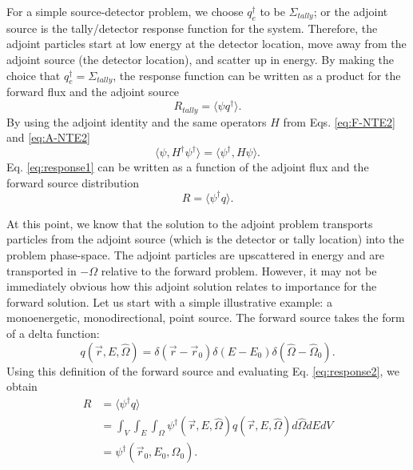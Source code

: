 For a simple source-detector problem, we choose
$q_{e}^{\dagger}$ to be $\Sigma_{tally}$; or the adjoint source is the
tally/detector response function
for the system. Therefore, the adjoint particles start at low energy at the detector
location, move away from the adjoint source (the detector location), and scatter
up in energy. By making the choice that $q_{e}^{\dagger} = \Sigma_{tally}$, the
response function can be written as a product for the forward flux and the
adjoint source
\begin{equation}
  R_{tally} = \langle \psi q^{\dagger} \rangle .
  \label{eq:response1}
\end{equation}
By using the adjoint identity and the same operators $H$ from Eqs. \eqref{eq:F-NTE2}
and \eqref{eq:A-NTE2}
\begin{equation}
  \langle \psi, H^{\dagger} \psi^{\dagger} \rangle =
  \langle \psi^{\dagger}, H \psi \rangle .
\end{equation}
Eq. \eqref{eq:response1} can be written as a function of the
adjoint flux and the forward source distribution
\begin{equation}
  R = \langle \psi^{\dagger} q \rangle .
  \label{eq:response2}
\end{equation}

At this point, we know that the solution to the adjoint problem
transports particles from the adjoint source (which is the detector or tally
location) into the problem phase-space. The adjoint particles are
upscattered in energy and are transported in $-\Omega$ relative to the forward
problem. However, it may not be immediately obvious how this adjoint solution
relates to importance for the forward solution. Let us start with a simple
illustrative example: a monoenergetic, monodirectional, point source. The
forward source takes the form of a delta function:
\begin{equation*}
  q(\vec{r}, E, \hat{\Omega}) = \delta(\vec{r}-\vec{r}_0) \delta(E-E_0)
  \delta(\hat{\Omega}-\hat{\Omega}_0) .
\end{equation*}
Using this definition of the forward source and evaluating Eq.
\eqref{eq:response2}, we obtain
\begin{equation*}
  \begin{split}
    R &= \langle \psi^{\dagger} q \rangle \\
    &= \int_{V} \int_{E} \int_{\Omega} \psi^{\dagger}(\vec{r}, E, \hat{\Omega})
       q(\vec{r}, E, \hat{\Omega}) d\hat\Omega dE dV \\
       & = \psi^{\dagger}(\vec{r}_0, E_0, \hat{\Omega}_0).
\end{split}
\end{equation*}


